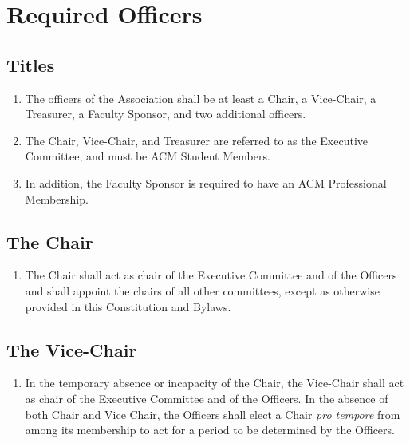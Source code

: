 \section{Required Officers}

\subsection{Titles}
\begin{enumerate}
	\item The officers of the Association shall be at least a Chair, a Vice-Chair, a Treasurer, a Faculty Sponsor, and two additional officers.
	\item The Chair, Vice-Chair, and Treasurer are referred to as the Executive Committee, and must be ACM Student Members.
	\item In addition, the Faculty Sponsor is required to have an ACM Professional Membership.
\end{enumerate}

\subsection{The Chair}
\begin{enumerate}
	\item The Chair shall act as chair of the Executive Committee and of the Officers and shall appoint the chairs of all other committees, except as otherwise provided in this Constitution and Bylaws.
\end{enumerate}

\subsection{The Vice-Chair}
\begin{enumerate}
	\item In the temporary absence or incapacity of the Chair, the Vice-Chair shall act as chair of the Executive Committee and of the Officers. In the absence of both Chair and Vice Chair, the Officers shall elect a Chair \textit{pro tempore} from among its membership to act for a period to be determined by the Officers.
\end{enumerate}

